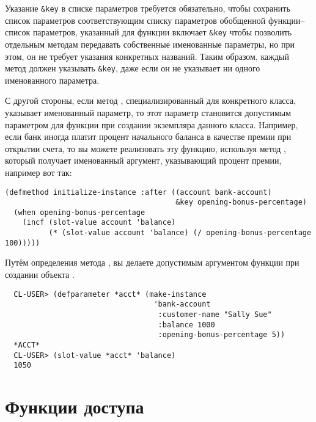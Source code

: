 Указание \lstinline!&key! в списке параметров требуется обязательно, чтобы сохранить
список параметров соответствующим списку параметров обобщенной функции-- список
параметров, указанный для функции  включает \lstinline!&key!
чтобы позволить отдельным методам передавать собственные именованные параметры, но при
этом, он не требует указания конкретных названий.  Таким образом, каждый метод должен
указывать \lstinline!&key!, даже если он не указывает ни одного именованного параметра.

С другой стороны, если метод , специализированный для
конкретного класса, указывает именованный параметр, то этот параметр становится допустимым
параметром для функции  при создании экземпляра данного класса.
Например, если банк иногда платит процент начального баланса в качестве премии при
открытии счета, то вы можете реализовать эту функцию, используя метод
, который получает именованный аргумент, указывающий процент
премии, например вот так:

\begin{lstlisting}
(defmethod initialize-instance :after ((account bank-account)
                                       &key opening-bonus-percentage)
  (when opening-bonus-percentage
    (incf (slot-value account 'balance)
          (* (slot-value account 'balance) (/ opening-bonus-percentage 100)))))
\end{lstlisting}

Путём определения метода , вы делаете
 допустимым аргументом функции  при
создании объекта .

\begin{verbatim}
  CL-USER> (defparameter *acct* (make-instance
                                  'bank-account
                                   :customer-name "Sally Sue"
                                   :balance 1000
                                   :opening-bonus-percentage 5))
  *ACCT*
  CL-USER> (slot-value *acct* 'balance)
  1050
\end{verbatim}

\section{Функции доступа}

